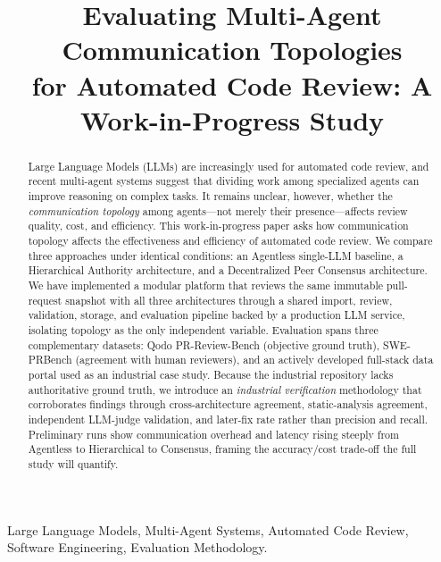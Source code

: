 \documentclass[conference]{IEEEtran}
\begin{document}
\title{Evaluating Multi-Agent Communication Topologies\\
for Automated Code Review: A Work-in-Progress Study}

\author{
}

\maketitle

\begin{abstract}
Large Language Models (LLMs) are increasingly used for automated code review, and
recent multi-agent systems suggest that dividing work among specialized agents can
improve reasoning on complex tasks. It remains unclear, however, whether the
\emph{communication topology} among agents---not merely their presence---affects
review quality, cost, and efficiency. This work-in-progress paper asks how
communication topology affects the effectiveness and efficiency of automated code
review. We compare three approaches under identical conditions: an Agentless
single-LLM baseline, a Hierarchical Authority architecture, and a Decentralized
Peer Consensus architecture. We have implemented a modular platform that reviews
the same immutable pull-request snapshot with all three architectures through a
shared import, review, validation, storage, and evaluation pipeline backed by a
production LLM service, isolating topology as the only independent variable.
Evaluation spans three complementary datasets: Qodo PR-Review-Bench (objective
ground truth), SWE-PRBench (agreement with human reviewers), and an actively
developed full-stack data portal used as an industrial case study. Because the
industrial repository lacks authoritative ground truth, we introduce an
\emph{industrial verification} methodology that corroborates findings through
cross-architecture agreement, static-analysis agreement, independent LLM-judge
validation, and later-fix rate rather than precision and recall. Preliminary runs
show communication overhead and latency rising steeply from Agentless to
Hierarchical to Consensus, framing the accuracy/cost trade-off the full study will
quantify.
\end{abstract}

\begin{IEEEkeywords}
Large Language Models, Multi-Agent Systems, Automated Code Review, Software
Engineering, Evaluation Methodology.
\end{IEEEkeywords}
\end{document}
